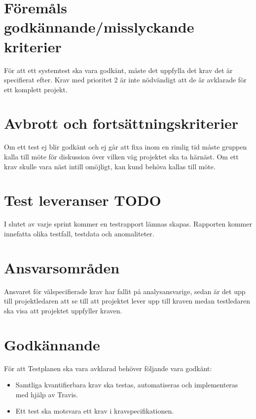 \documentclass[10pt]{article}
\begin{document}
	
	

\section{Föremåls godkännande/misslyckande kriterier}
	För att ett systemtest ska vara godkänt, måste det uppfylla det krav det är specifierat efter. Krav med prioritet 2 är inte nödvändigt att de är avklarade för ett komplett projekt.\\


\section{Avbrott och fortsättningskriterier}
	Om ett test ej blir godkänt och ej går att fixa inom en rimlig tid måste gruppen kalla till möte för diskussion över vilken väg projektet ska ta härnäst. Om ett krav skulle vara näst intill omöjligt, kan kund behöva kallas till möte.
	



\section{Test leveranser {\color{red}TODO}}
	I slutet av varje sprint kommer en testrapport lämnas skapas. Rapporten kommer innefatta olika testfall, testdata och anomaliteter.




\section{Ansvarsområden}
	Ansvaret för välspecifierade krav har fallit på analysansvarige, sedan är det upp till projektledaren att se till att projektet lever upp till kraven medan testledaren ska visa att projektet uppfyller kraven.

  

	
	
\section{Godkännande}
	För att Testplanen ska vara avklarad behöver följande vara godkänt:
	\begin{itemize}
	 \item Samtliga kvantifierbara krav ska testas, automatiseras och implementeras med hjälp av Travis.
	 \item Ett test ska motsvara ett krav i kravspecifikationen.
	\end{itemize}
	
\end{document}
